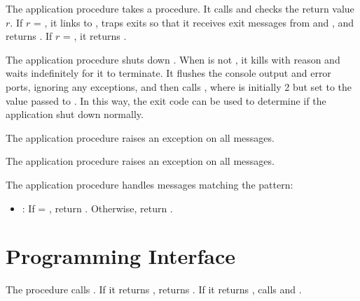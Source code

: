  The application  procedure
takes a  procedure. It calls  and
checks the return value $r$. If $r$ = ,
it links to , traps exits so that it receives exit
messages from  and , and
returns . If $r$ = , it returns .

 The application 
procedure shuts down . When  is not
, it kills  with reason  and
waits indefinitely for it to terminate. It flushes the console
output and error ports, ignoring any exceptions, and then calls
, where  is initially
2 but set to the value passed to . In this
way, the exit code can be used to determine if the application shut
down normally.

 The application
 procedure raises an exception on all messages.

 The application
 procedure raises an exception on all messages.

 The application
 procedure handles messages matching the pattern:\antipar

\begin{itemize}
\item {}: If  =
  , return . Otherwise,
  return .
\end{itemize}

\section {Programming Interface}

\begin{procedure}
\end{procedure}
\returns{} 

The  procedure calls
. If it returns
,  returns . If
it returns , 
calls  and .

